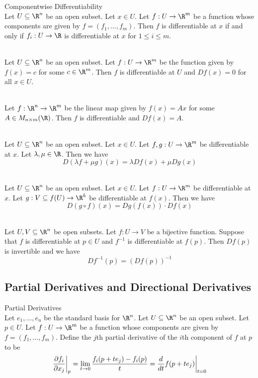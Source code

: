 \documentclass[a4paper]{article}
\begin{document}
\begin{prp}{Componentwise Differentiability}{}\\
Let $U\subseteq\R^n$ be an open subset. Let $x\in U$. Let $f:U\to\R^m$ be a function whose components are given by $f=(f_1,\dots,f_m)$. Then $f$ is differentiable at $x$ if and only if $f_i:U\to\R$ is differentiable at $x$ for $1\leq i\leq m$. 
\end{prp}

\begin{eg}{}{}\\
Let $U\subseteq\R^n$ be an open subset. Let $f:U\to\R^m$ be the function given by $f(x)=c$ for some $c\in\R^m$. Then $f$ is differentiable at $U$ and $Df(x)=0$ for all $x\in U$. 
\end{eg}

\begin{eg}{}{}\\
Let $f:\R^n\to\R^m$ be the linear map given by $f(x)=Ax$ for some $A\in M_{n\times m}(\R)$. Then $f$ is differentiable and $Df(x)=A$. 
\end{eg}

\begin{prp}{}{}\\
Let $U\subseteq\R^n$ be an open subset. Let $x\in U$. Let $f,g:U\to\R^m$ be differentiable at $x$. Let $\lambda,\mu\in\R$. Then we have $$D(\lambda f+\mu g)(x)=\lambda Df(x)+\mu Dg(x)$$
\end{prp}

\begin{prp}{}{}\\
Let $U\subseteq\R^n$ be an open subset. Let $x\in U$. Let $f:U\to\R^m$ be differentiable at $x$. Let $g:V\subseteq f(U)\to\R^k$ be differentiable at $f(x)$. Then we have $$D(g\circ f)(x)=Dg(f(x))\cdot Df(x)$$
\end{prp}

\begin{prp}{}{}\\
Let $U,V\subseteq\R^n$ be open subsets. Let $f:U\to V$ be a bijective function. Suppose that $f$ is differentiable at $p\in U$ and $f^{-1}$ is differentiable at $f(p)$. Then $Df(p)$ is invertible and we have $$Df^{-1}(p)=(Df(p))^{-1}$$
\end{prp}

\subsection{Partial Derivatives and Directional Derivatives}
\begin{defn}{Partial Derivatives}{}\\
Let $e_1,\dots,e_n$ be the standard basis for $\R^n$. Let $U\subseteq\R^n$ be an open subset. Let $p\in U$. Let $f:U\to\R^m$ be a function whose components are given by $f=(f_1,\dots,f_m)$. Define the $j$th partial derivative of the $i$th component of $f$ at $p$ to be $$\frac{\partial f_i}{\partial x_j}\bigg{|}_p=\lim_{t\to 0}\frac{f_i(p+te_j)-f_i(p)}{t}=\frac{d}{dt}f(p+te_j)\bigg{|}_{t=0}$$
\end{defn}
\end{document}
